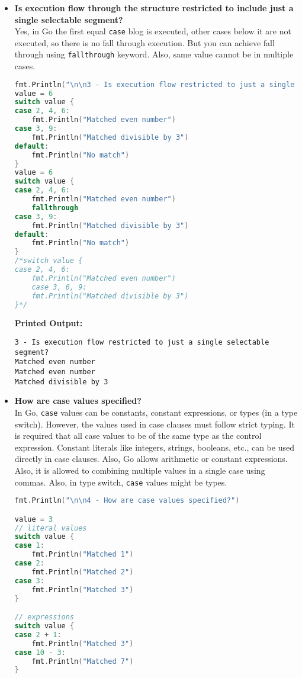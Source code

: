 \documentclass{article}
\begin{document}
\begin{itemize}
\item \textbf{Is execution flow through the structure restricted to include just a single selectable segment?} \\
Yes, in Go the first equal \texttt{case} blog is executed, other cases below it are not executed, so there is no fall through execution. But you can achieve fall through using \texttt{fallthrough} keyword. Also, same value cannot be in multiple cases.
\begin{lstlisting}[language=Go]
fmt.Println("\n\n3 - Is execution flow restricted to just a single selectable segment?")
value = 6
switch value {
case 2, 4, 6:
    fmt.Println("Matched even number")
case 3, 9: 
    fmt.Println("Matched divisible by 3")
default:
    fmt.Println("No match")
}
value = 6
switch value {
case 2, 4, 6:
    fmt.Println("Matched even number")
    fallthrough
case 3, 9: 
    fmt.Println("Matched divisible by 3")
default:
    fmt.Println("No match")
}
/*switch value {
case 2, 4, 6:
    fmt.Println("Matched even number")
    case 3, 6, 9:
    fmt.Println("Matched divisible by 3")
}*/
\end{lstlisting}
\textbf{Printed Output:} \begin{verbatim}
3 - Is execution flow restricted to just a single selectable segment?
Matched even number
Matched even number
Matched divisible by 3
\end{verbatim}

\item \textbf{How are case values specified?} \\
In Go, \texttt{case} values can be constants, constant expressions, or types (in a type switch). However, the values used in case clauses must follow strict typing. It is required that all case values to be of the same type as the control expression. Constant literals like integers, strings, booleans, etc., can be used directly in case clauses. Also, Go allows arithmetic or constant expressions. Also, it is allowed to combining multiple values in a single case using commas. Also, in type switch, \texttt{case} values might be types.
\begin{lstlisting}[language=Go]
fmt.Println("\n\n4 - How are case values specified?")

value = 3
// literal values
switch value {
case 1:
    fmt.Println("Matched 1")
case 2:
    fmt.Println("Matched 2")
case 3:
    fmt.Println("Matched 3")
}

// expressions
switch value {
case 2 + 1:
    fmt.Println("Matched 3")
case 10 - 3:
    fmt.Println("Matched 7")
}


\end{lstlisting}
\end{itemize}
\end{document}
